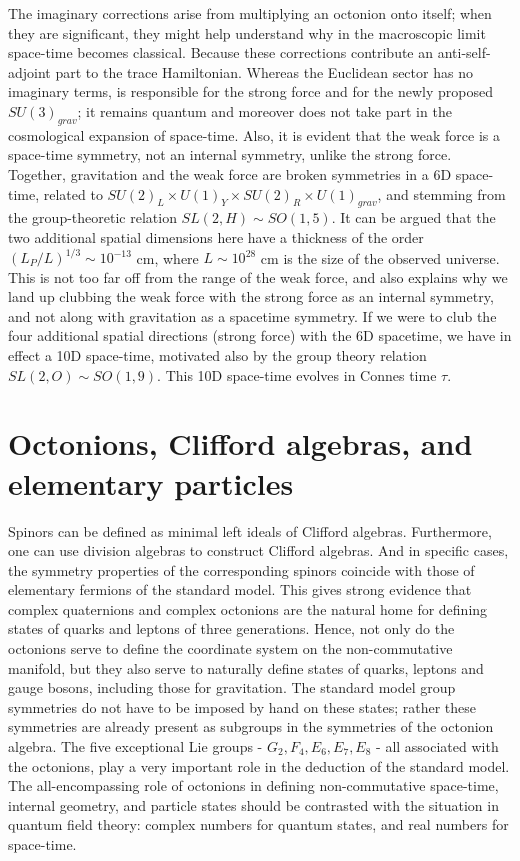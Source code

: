 \documentclass[a4paper]{jpconf}
\begin{document}
The imaginary corrections arise from multiplying an octonion onto itself; when they are significant, they might help understand why in the macroscopic limit 
space-time becomes classical. Because these corrections contribute an anti-self-adjoint part to the trace Hamiltonian. Whereas the Euclidean sector has no imaginary terms, is responsible for the strong force and for the newly proposed $SU(3)_{grav}$; it remains quantum and moreover does not take part in the cosmological expansion of space-time.  Also, it is evident that the weak force is a space-time symmetry, not an internal symmetry,  unlike the strong force. Together, gravitation and the weak force are broken symmetries in a 6D space-time, related to $SU(2)_L \times U(1)_Y \times SU(2)_R \times U(1)_{grav}$, and  stemming from the group-theoretic relation $SL(2,H) \sim SO(1,5)$. It can be argued that the two additional spatial dimensions here have a thickness of the order $(L_P/L)^{1/3}\sim 10^{-13}$ cm, where $L\sim 10^{28}$ cm is the size of the observed universe. This is not too far off from the range of the weak force, and also explains why we land up clubbing the weak force with the strong force as an internal symmetry, and not along with gravitation as a spacetime symmetry. If we were to club the four additional spatial directions (strong force) with the 6D spacetime, we have in effect a 10D space-time, motivated also by the group theory relation $SL(2,O)\sim SO(1,9)$. This 10D space-time evolves in Connes time $\tau$.

\section{Octonions, Clifford algebras, and elementary particles}
Spinors can be defined as minimal left ideals of Clifford algebras. Furthermore, one can use division algebras to construct Clifford algebras. And in specific cases, the symmetry properties of the corresponding spinors coincide with those of elementary fermions of the standard model. This gives strong evidence that complex quaternions and complex octonions are the natural home for defining states of quarks and leptons of three generations. Hence, not only do the octonions serve to define the coordinate system on the non-commutative manifold, but they also serve to naturally define states of quarks, leptons and gauge bosons, including those for gravitation. The standard model group symmetries do not have to be imposed by hand on these states; rather these symmetries are already present as subgroups in the symmetries of the octonion algebra. The five exceptional Lie groups - $G_2, F_4, E_6, E_7, E_8$ - all associated with the octonions, play a very important role in the deduction of the standard model. The all-encompassing role of octonions in defining non-commutative space-time, internal geometry, and particle states should be contrasted with the situation in quantum field theory: complex numbers for quantum states, and real numbers for space-time.
\end{document}
